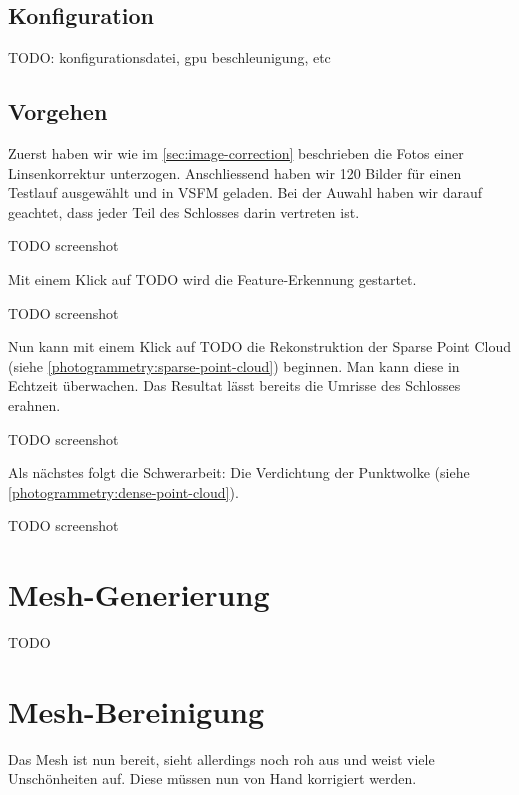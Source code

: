 \subsection{Konfiguration}

TODO: konfigurationsdatei, gpu beschleunigung, etc

\subsection{Vorgehen}

Zuerst haben wir wie im \autoref{sec:image-correction} beschrieben die Fotos
einer Linsenkorrektur unterzogen. Anschliessend haben wir 120 Bilder für einen
Testlauf ausgewählt und in VSFM geladen. Bei der Auwahl haben wir darauf
geachtet, dass jeder Teil des Schlosses darin vertreten ist.

TODO screenshot

Mit einem Klick auf TODO wird die Feature-Erkennung gestartet.

TODO screenshot

Nun kann mit einem Klick auf TODO die Rekonstruktion der Sparse Point Cloud
(siehe \autoref{photogrammetry:sparse-point-cloud}) beginnen. Man kann diese in
Echtzeit überwachen. Das Resultat lässt bereits die Umrisse des Schlosses
erahnen.

TODO screenshot

Als nächstes folgt die Schwerarbeit: Die Verdichtung der Punktwolke (siehe
\autoref{photogrammetry:dense-point-cloud}).

TODO screenshot



\section{Mesh-Generierung}

TODO


\section{Mesh-Bereinigung}

\label{workflow:mesh-cleanup}

Das Mesh ist nun bereit, sieht allerdings noch roh aus und weist viele
Unschönheiten auf. Diese müssen nun von Hand korrigiert werden.


